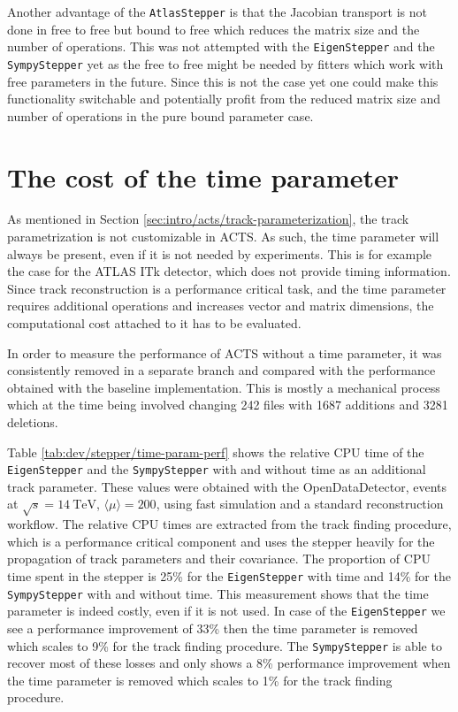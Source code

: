 Another advantage of the \texttt{AtlasStepper} is that the Jacobian transport is not done in free to free but bound to free which reduces the matrix size and the number of operations. This was not attempted with the \texttt{EigenStepper} and the \texttt{SympyStepper} yet as the free to free might be needed by fitters which work with free parameters in the future. Since this is not the case yet one could make this functionality switchable and potentially profit from the reduced matrix size and number of operations in the pure bound parameter case.

\section{The cost of the time parameter}

As mentioned in Section \ref{sec:intro/acts/track-parameterization}, the track parametrization is not customizable in ACTS. As such, the time parameter will always be present, even if it is not needed by experiments. This is for example the case for the ATLAS ITk detector, which does not provide timing information. Since track reconstruction is a performance critical task, and the time parameter requires additional operations and increases vector and matrix dimensions, the computational cost attached to it has to be evaluated.

In order to measure the performance of ACTS without a time parameter, it was consistently removed in a separate branch and compared with the performance obtained with the baseline implementation. This is mostly a mechanical process which at the time being involved changing 242 files with 1687 additions and 3281 deletions.



Table \ref{tab:dev/stepper/time-param-perf} shows the relative CPU time of the \texttt{EigenStepper} and the \texttt{SympyStepper} with and without time as an additional track parameter. These values were obtained with the OpenDataDetector, \ttbar events at $\sqrt{s} = 14 \ \text{TeV}$, $\langle \mu \rangle = 200$, using fast simulation and a standard reconstruction workflow. The relative CPU times are extracted from the track finding procedure, which is a performance critical component and uses the stepper heavily for the propagation of track parameters and their covariance. The proportion of CPU time spent in the stepper is 25\% for the \texttt{EigenStepper} with time and 14\% for the \texttt{SympyStepper} with and without time. This measurement shows that the time parameter is indeed costly, even if it is not used. In case of the \texttt{EigenStepper} we see a performance improvement of 33\% then the time parameter is removed which scales to 9\% for the track finding procedure. The \texttt{SympyStepper} is able to recover most of these losses and only shows a 8\% performance improvement when the time parameter is removed which scales to 1\% for the track finding procedure.

